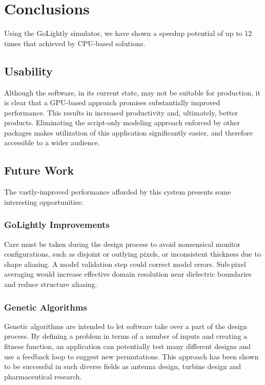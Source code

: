 \chapter{Conclusions} \label{ch:conclusions}

Using the GoLightly simulator, we have shown a speedup potential of up to 12 times that achieved by CPU-based solutions.

\section{Usability}

Although the software, in its current state, may not be suitable for production, it is clear that a GPU-based approach promises substantially improved performance. This results in increased productivity and, ultimately, better products. Eliminating the script-only modeling approach enforced by other packages makes utilization of this application significantly easier, and therefore accessible to a wider audience.

\section{Future Work}

The vastly-improved performance afforded by this system presents some interesting opportunities:

\subsection{GoLightly Improvements}

Care must be taken during the design process to avoid nonsensical monitor configurations, such as disjoint or outlying pixels, or inconsistent thickness due to shape aliasing. A model validation step could correct model errors. Sub-pixel averaging would increase effective domain resolution near dielectric boundaries and reduce structure aliasing. 

\clearpage

\subsection{Genetic Algorithms}
Genetic algorithms\cite{Mitchell:1998:IGA:522098}\cite{Goldberg:1989:GAS:534133}  are intended to let software take over a part of the design process. By defining a problem in terms of a number of inputs and creating a fitness function, an application can potentially test many different designs and use a feedback loop to suggest new permutations. This approach has been shown to be successful in such diverse fields as antenna design\cite{globus2006automated}, turbine design\cite{MOSETTI1994105} and pharmaceutical research\cite{Chi:2009:MLG:1651932.1652161}. 

